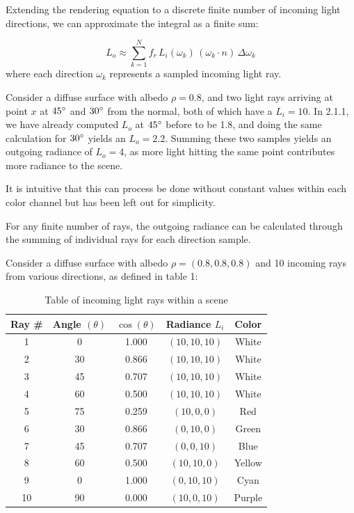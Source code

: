 \documentclass[12pt]{article}
\begin{document}
Extending the rendering equation to a discrete finite number of incoming light directions, we can approximate the integral as a finite sum:

\[
L_o \approx \sum_{k=1}^{N} f_r \, L_i(\omega_k) \, (\omega_k \cdot n) \, \Delta \omega_k
\]
where each direction $\omega_k$ represents a sampled incoming light ray.
\newline

Consider a diffuse surface with albedo $\rho = 0.8$, and two light rays arriving at point $x$ at $45 \degree$ and $30 \degree$ from the normal, both of which have a $L_i = 10$.
In 2.1.1, we have already computed $L_o$ at $45 \degree$ before to be 1.8, and doing the same calculation for $30 \degree$ yields an $L_o = 2.2$. Summing these two samples yields an outgoing radiance of $L_o = 4$, as more light hitting the same point contributes more radiance to the scene.

It is intuitive that this can process be done without constant values within each color channel but has been left out for simplicity.
\newline



For any finite number of rays, the outgoing radiance can be calculated through the summing of individual rays for each direction sample.
\newline

Consider a diffuse surface with albedo $\rho = (0.8, 0.8, 0.8)$ and 10 incoming rays from various directions, as defined in table 1:
\begin{table}[h!]
\centering
\begin{tabular}{|c|c|c|c|c|}
\hline
\textbf{Ray \#} & \textbf{Angle $(\theta)$} & \textbf{$\cos(\theta)$} & \textbf{Radiance $L_i$} & \textbf{Color} \\
\hline
1  & 0   & 1.000 & $(10,10,10)$ & White \\
2  & 30  & 0.866 & $(10,10,10)$ & White \\
3  & 45  & 0.707 & $(10,10,10)$ & White \\
4  & 60  & 0.500 & $(10,10,10)$ & White \\
5  & 75  & 0.259 & $(10,0,0)$ & Red \\
6  & 30  & 0.866 & $(0,10,0)$ & Green \\
7  & 45  & 0.707 & $(0,0,10)$ & Blue \\
8  & 60  & 0.500 & $(10,10,0)$ & Yellow \\
9  & 0   & 1.000 & $(0,10,10)$ & Cyan \\
10 & 90  & 0.000 & $(10,0,10)$ & Purple \\
\hline

\end{tabular}
\caption{Table of incoming light rays within a scene}
\end{table}
\end{document}
